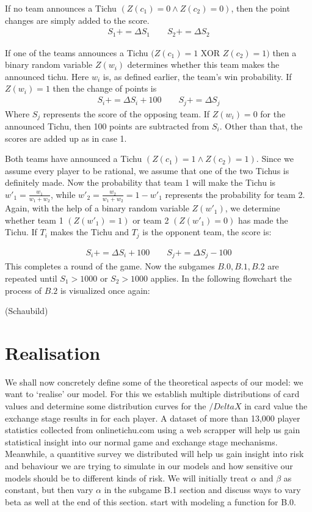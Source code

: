 \begin{axioms}[(C1)]
\item   If no team announces a Tichu $(Z(c_1) = 0 \land Z(c_2) = 0)$, then the point changes are simply added to the score.
\begin{gather*}
S_1 += \Delta S_1 \qquad S_2 += \Delta S_2
\end{gather*}
\item If one of the teams announces a Tichu $(Z(c_1) = 1$ XOR $Z(c_2) = 1)$ then a binary random variable $Z(w_i)$ determines whether this team makes the announced tichu. Here $w_i$ is, as defined earlier, the team's win probability. If $Z(w_i) = 1$ then the change of points is
\begin{gather*}
S_i += \Delta S_i + 100 \qquad S_j += \Delta S_j
\end{gather*}
Where $S_j$ represents the score of the opposing team. If $Z(w_i) = 0$ for the announced Tichu, then 100 points are subtracted from $S_i$. Other than that, the scores are added up as in case 1.
\item Both teams have announced a Tichu $(Z(c_1) = 1 \land Z(c_2) = 1)$. Since we assume every player to be rational, we assume that one of the two Tichus is definitely made. Now the probability that team 1 will make the Tichu is $w'_1 = \frac{w_1}{w_1+w_2}$, while $w'_2 =\frac{w_2}{w_1+w_2} = 1- w'_1$ represents the probability for team 2. Again, with the help of a binary random variable $Z(w'_1)$, we determine whether team 1 $(Z(w'_1) = 1)$ or team 2 $(Z(w'_1) = 0)$ has made the Tichu. If $T_i$ makes the Tichu and $T_j$ is the opponent team, the score is:

\begin{gather*}
S_i += \Delta S_i + 100 \qquad S_j += \Delta S_j - 100
\end{gather*}
This completes a round of the game. Now the subgames $B.0,B.1,B.2$ are repeated until $S_1 > 1000$ or $S_2 > 1000$ applies. In the following flowchart the process of $B.2$ is visualized once again:
\end{axioms}
(Schaubild)
\section{Realisation}
We shall now concretely define some of the theoretical aspects of our model: we want to ‘realise’ our model. For this we establish multiple distributions of card values and determine some distribution curves for the $/Delta  X$ in card value the exchange stage results in for each player. A dataset of more than 13,000 player statistics collected from onlinetichu.com using a web scrapper will help us gain statistical insight into our normal game and exchange stage mechanisms. Meanwhile, a quantitive survey we distributed will help us gain insight into risk and behaviour we are trying to simulate in our models and how sensitive our models should be to different kinds of risk. We will initially treat $\alpha$ and $\beta$ as constant, but then vary $\alpha$ in the subgame B.1 section and discuss ways to vary beta as well at the end of this section. start with modeling a function for B.0.

